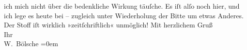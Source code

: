 \begin{ledgroupsized}[t]{13cm}
                    ich mich nicht über die bedenkliche Wirkung täuſche. Es iſt alſo noch hier, und
                    ich lege es heute bei – zugleich unter Wiederholung der Bitte um etwas Anderes.
                    Der Stoff iſt wirklich
                    »zeitſchriftlich« unmöglich!\pend
           \pstart
           Mit herzlichem Gruß{\\[\baselineskip]}Ihr{\\[\baselineskip]}\spacefill\mbox{W. Bölsche}\pend
           \leftskip=0em{}          \endnumbering{}\end{ledgroupsized}  \newcommand{\dateiname}{L00106}\newcommand{\titel}{Wilhelm Bölsche an Arthur Schnitzler, [24. 7. 1892]}\newcommand{\editorInnen}{Martin Anton Müller und Gerd-Hermann Susen}
      